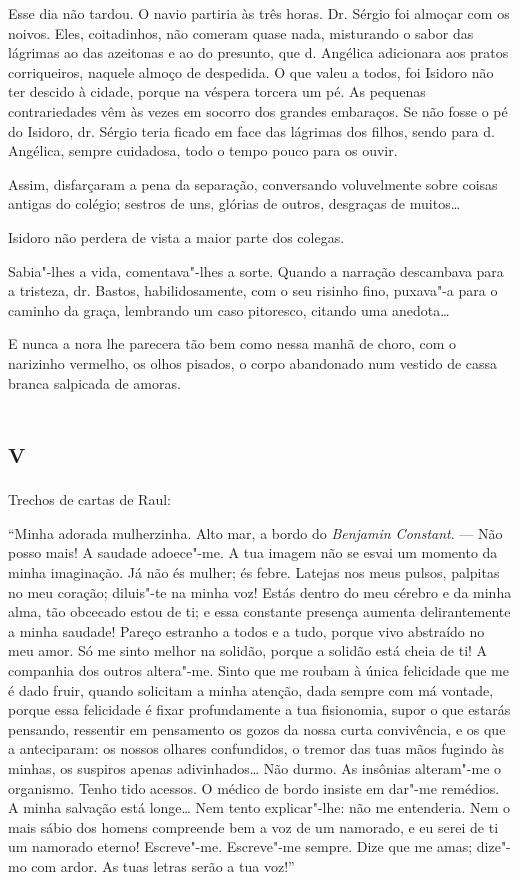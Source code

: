 Esse dia não tardou. O navio partiria às três horas. Dr. Sérgio foi
almoçar com os noivos. Eles, coitadinhos, não comeram quase nada,
misturando o sabor das lágrimas ao das azeitonas e ao do presunto, que
d. Angélica adicionara aos pratos corriqueiros, naquele almoço de
despedida. O que valeu a todos, foi Isidoro não ter descido à cidade,
porque na véspera torcera um pé. As pequenas contrariedades vêm às vezes
em socorro dos grandes embaraços. Se não fosse o pé do Isidoro, dr.
Sérgio teria ficado em face das lágrimas dos filhos, sendo para d.
Angélica, sempre cuidadosa, todo o tempo pouco para os ouvir.

Assim, disfarçaram a pena da separação, conversando voluvelmente sobre
coisas antigas do colégio; sestros de uns, glórias de outros, desgraças
de muitos\ldots{}

Isidoro não perdera de vista a maior parte dos colegas.

Sabia"-lhes a vida, comentava"-lhes a sorte. Quando a narração descambava
para a tristeza, dr. Bastos, habilidosamente, com o seu risinho fino,
puxava"-a para o caminho da graça, lembrando um caso pitoresco, citando
uma anedota\ldots{}

E nunca a nora lhe parecera tão bem como nessa manhã de choro, com o
narizinho vermelho, os olhos pisados, o corpo abandonado num vestido de
cassa branca salpicada de amoras.

\section{\textsc{v}}

Trechos de cartas de Raul:

``Minha adorada mulherzinha. Alto mar, a bordo do \emph{Benjamin
Constant}. --- Não posso mais! A saudade adoece"-me. A tua imagem não se
esvai um momento da minha imaginação. Já não és mulher; és febre.
Latejas nos meus pulsos, palpitas no meu coração; diluis"-te na minha
voz! Estás dentro do meu cérebro e da minha alma, tão obcecado estou de
ti; e essa constante presença aumenta delirantemente a minha saudade!
Pareço estranho a todos e a tudo, porque vivo abstraído no meu amor. Só
me sinto melhor na solidão, porque a solidão está cheia de ti! A
companhia dos outros altera"-me. Sinto que me roubam à única felicidade
que me é dado fruir, quando solicitam a minha atenção, dada sempre com
má vontade, porque essa felicidade é fixar profundamente a tua
fisionomia, supor o que estarás pensando, ressentir em pensamento os
gozos da nossa curta convivência, e os que a anteciparam: os nossos
olhares confundidos, o tremor das tuas mãos fugindo às minhas, os
suspiros apenas adivinhados\ldots{} Não durmo. As insônias alteram"-me o
organismo. Tenho tido acessos. O médico de bordo insiste em dar"-me
remédios. A minha salvação está longe\ldots{} Nem tento explicar"-lhe: não me
entenderia. Nem o mais sábio dos homens compreende bem a voz de um
namorado, e eu serei de ti um namorado eterno! Escreve"-me. Escreve"-me
sempre. Dize que me amas; dize"-mo com ardor. As tuas letras serão a tua
voz!''

